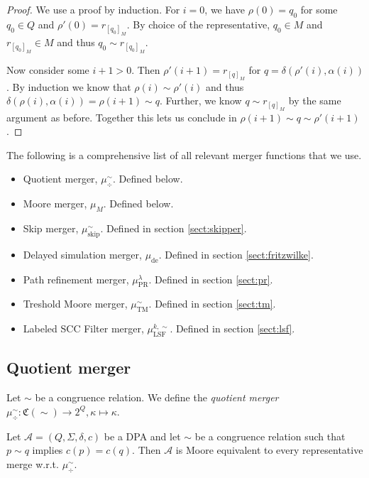 \begin{proof}
	We use a proof by induction. For $i = 0$, we have $\rho(0) = q_0$ for some $q_0 \in Q$ and $\rho'(0) = r_{[q_0]_M}$. By choice of the representative, $q_0 \in M$ and $r_{[q_0]_M} \in M$ and thus $q_0 \sim r_{[q_0]_M}$.
	
	Now consider some $i+1 > 0$. Then $\rho'(i+1) = r_{[q]_M}$ for $q = \delta(\rho'(i), \alpha(i))$. By induction we know that $\rho(i) \sim \rho'(i)$ and thus $\delta(\rho(i), \alpha(i)) = \rho(i+1) \sim q$. Further, we know $q \sim r_{[q]_M}$ by the same argument as before. Together this lets us conclude in $\rho(i+1) \sim q \sim \rho'(i+1)$.
\end{proof}

\vspace{10pt}

The following is a comprehensive list of all relevant merger functions that we use.

\begin{itemize}
	\item Quotient merger, $\mu_\div^\sim$. Defined below.
	\item Moore merger, $\mu_M$. Defined below.
	\item Skip merger, $\mu_\text{skip}^\sim$. Defined in section \ref{sect:skipper}.
	\item Delayed simulation merger, $\mu_\text{de}$. Defined in section \ref{sect:fritzwilke}.
	\item Path refinement merger, $\mu_\text{PR}^\lambda$. Defined in section \ref{sect:pr}.
	\item Treshold Moore merger, $\mu_\text{TM}^\sim$. Defined in section \ref{sect:tm}.
	\item Labeled SCC Filter merger, $\mu_\text{LSF}^{k,\sim}$. Defined in section \ref{sect:lsf}.
\end{itemize}

\vspace{5pt}

\subsection{Quotient merger}
\begin{defn}
	Let $\sim$ be a congruence relation. We define the \emph{quotient merger} $\mu^\sim_\div : \mathfrak{C}(\sim) \rightarrow 2^Q, \kappa \mapsto \kappa$. 
\end{defn}


\begin{lem}
\label{lem:general:congrel_prio_implies_moore}
	Let $\mathcal{A} = (Q, \Sigma, \delta, c)$ be a DPA and let $\sim$ be a congruence relation such that $p \sim q$ implies $c(p) = c(q)$. Then $\mathcal{A}$ is Moore equivalent to every representative merge w.r.t. $\mu_\div^\sim$.
\end{lem} 

